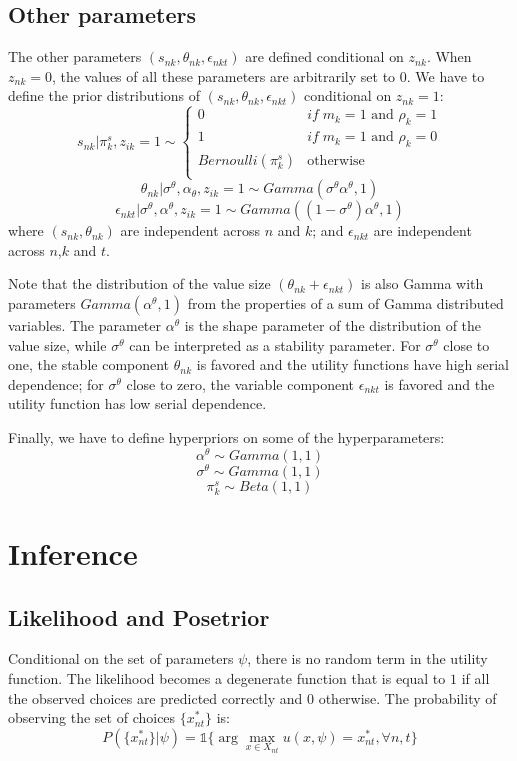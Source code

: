 \documentclass[12pt]{article}
\begin{document}
\subsection{Other parameters}

The other parameters $(s_{nk},\theta_{nk},\epsilon_{nkt})$ are defined conditional on $z_{nk}$. When $z_{nk}=0$, the values of all these parameters are arbitrarily set to $0$. We have to define the prior distributions of $(s_{nk},\theta_{nk},\epsilon_{nkt})$ conditional on $z_{nk}=1$:
$$ s_{nk}|\pi_k^s,z_{ik}=1 \sim \left\{ \begin{array}{cl}
0 & if \; m_k=1 \text{ and } \rho_k=1\\
1 & if \; m_k=1 \text{ and } \rho_k=0\\
Bernoulli(\pi_k^s) & \text{otherwise}\\
\end{array}\right.$$
$$ \theta_{nk}|\sigma^\theta,\alpha_\theta,z_{ik}=1 \sim Gamma(\sigma^\theta \alpha^\theta,1) $$
$$ \epsilon_{nkt}|\sigma^\theta,\alpha^\theta,z_{ik}=1 \sim Gamma((1-\sigma^\theta)\alpha^\theta,1) $$
where $(s_{nk},\theta_{nk})$ are independent across $n$ and $k$; and $\epsilon_{nkt}$ are independent across $n$,$k$ and $t$.

Note that the distribution of the value size $(\theta_{nk} + \epsilon_{nkt})$ is also Gamma with parameters $Gamma(\alpha^\theta,1)$ from the properties of a sum of Gamma distributed variables. The parameter $\alpha^\theta$ is the shape parameter of the distribution of the value size, while $\sigma^\theta$ can be interpreted as a stability parameter. 
For $\sigma^\theta$ close to one, the stable component $\theta_{nk}$ is favored and the utility functions have high serial dependence; for $\sigma^\theta$ close to zero, the variable component $\epsilon_{nkt}$ is favored and the utility function has low serial dependence.

Finally, we have to define hyperpriors on some of the hyperparameters:
$$\alpha^\theta \sim Gamma(1,1)$$
$$\sigma^\theta \sim Gamma(1,1)$$
$$ \pi_k^s \sim Beta(1,1) $$


\section{Inference}

\subsection{Likelihood and Posetrior} \label{sec:likelihood}
Conditional on the set of parameters $\psi$, there is no random term in the utility function. The likelihood becomes a degenerate function that is equal to $1$ if all the observed choices are predicted correctly and $0$ otherwise. The probability of observing the set of choices $\{x_{nt}^*\}$ is: 
$$P(\{x_{nt}^*\}|\psi) = \mathds{1}\{ \arg \max\limits_{x\in X_{nt}} u(x,\psi) = x_{nt}^*, \forall n,t \}$$
\end{document}
